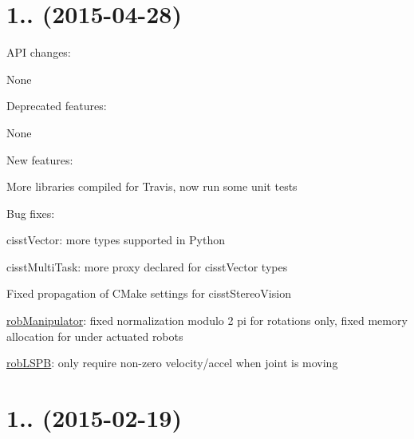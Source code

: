 \section*{1.. (2015-\/04-\/28) }


\begin{DoxyItemize}
\item A\-P\-I changes\-:
\begin{DoxyItemize}
\item None
\end{DoxyItemize}
\item Deprecated features\-:
\begin{DoxyItemize}
\item None
\end{DoxyItemize}
\item New features\-:
\begin{DoxyItemize}
\item More libraries compiled for Travis, now run some unit tests
\end{DoxyItemize}
\item Bug fixes\-:
\begin{DoxyItemize}
\item cisst\-Vector\-: more types supported in Python
\item cisst\-Multi\-Task\-: more proxy declared for cisst\-Vector types
\item Fixed propagation of C\-Make settings for cisst\-Stereo\-Vision
\item \hyperlink{classrob_manipulator}{rob\-Manipulator}\-: fixed normalization modulo 2 pi for rotations only, fixed memory allocation for under actuated robots
\item \hyperlink{classrob_l_s_p_b}{rob\-L\-S\-P\-B}\-: only require non-\/zero velocity/accel when joint is moving
\end{DoxyItemize}
\end{DoxyItemize}

\section*{1.. (2015-\/02-\/19) }


